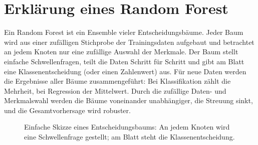\section{Erklärung eines Random Forest}\label{sec:erklaer_rf}
Ein Random Forest ist ein Ensemble vieler Entscheidungsbäume. Jeder Baum wird aus einer zufälligen Stichprobe 
der Trainingsdaten aufgebaut und betrachtet an jedem Knoten nur eine zufällige Auswahl der Merkmale. Der Baum 
stellt einfache Schwellenfragen, teilt die Daten Schritt für Schritt und gibt am Blatt eine Klassenentscheidung 
(oder einen Zahlenwert) aus. Für neue Daten werden die Ergebnisse aller Bäume zusammengeführt: Bei Klassifikation 
zählt die Mehrheit, bei Regression der Mittelwert. Durch die zufällige Daten- und Merkmalswahl werden die Bäume 
voneinander unabhängiger, die Streuung sinkt, und die Gesamtvorhersage wird robuster.

\begin{figure}[h!]
\centering
{}
\caption{Einfache Skizze eines Entscheidungsbaums: An jedem Knoten wird eine Schwellenfrage gestellt; am Blatt steht die Klassenentscheidung.}
\end{figure}

